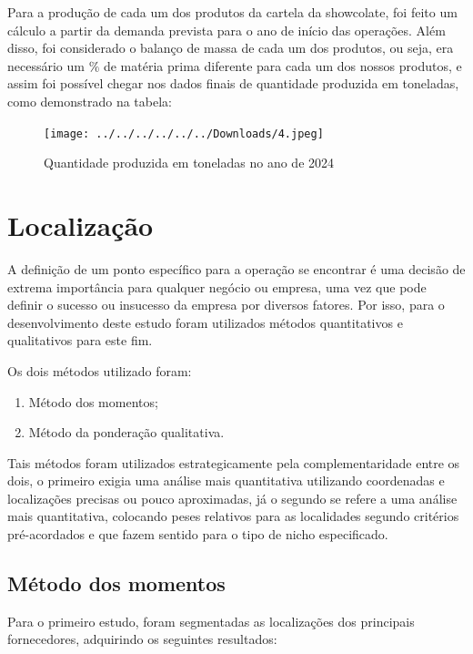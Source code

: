 \documentclass[
	12pt,				%
	openright,			%
	oneside,			%
	a4paper,			%
	english,			%
	french,				%
	spanish,			%
	brazil				%
	]{abntex2}
\begin{document}
Para a produção de cada um dos produtos da cartela da showcolate, foi feito um cálculo a partir da demanda prevista para o ano de início das operações. Além disso, foi considerado o balanço de massa de cada um dos produtos, ou seja, era necessário um $\%$ de matéria prima diferente para cada um dos nossos produtos, e assim foi possível chegar nos dados finais de quantidade produzida em toneladas, como demonstrado na tabela:

\begin{figure}[H]
\begin{center}
\caption{Quantidade produzida em toneladas no ano de 2024}
\texttt{[image: ../../../../../../Downloads/4.jpeg]} 
\end{center}
\end{figure}


\chapter{Localização}

A definição de um ponto específico para a operação se encontrar é uma decisão de extrema importância para qualquer negócio ou empresa, uma vez que pode definir o sucesso ou insucesso da empresa por diversos fatores. Por isso, para o desenvolvimento deste estudo foram utilizados métodos quantitativos e qualitativos para este fim.

Os dois métodos utilizado foram:

\begin{enumerate}
\item Método dos momentos;
\item Método da ponderação qualitativa.
\end{enumerate}

Tais métodos foram utilizados estrategicamente pela complementaridade entre os dois, o primeiro exigia uma análise mais quantitativa utilizando coordenadas e localizações precisas ou pouco aproximadas, já o  segundo se refere a uma análise mais quantitativa, colocando peses relativos para as localidades segundo critérios pré-acordados e que fazem sentido para o tipo de nicho especificado.

\section{Método dos momentos}

Para o primeiro estudo, foram segmentadas as localizações dos principais fornecedores, adquirindo os seguintes resultados:
\end{document}
